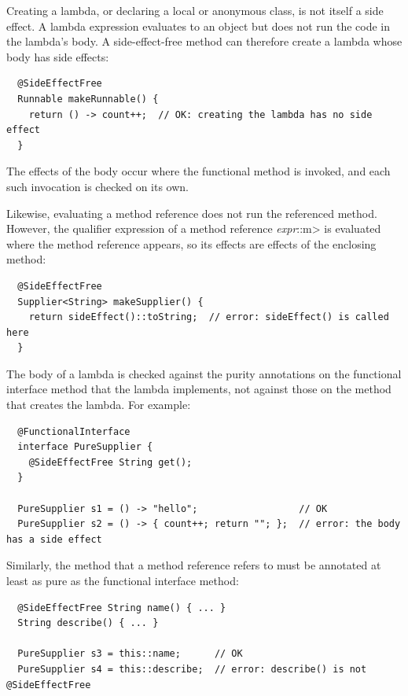 
Creating a lambda, or declaring a local or anonymous class, is not itself a
side effect.  A lambda expression evaluates to an object but does not run the code
in the lambda's body.  A side-effect-free method can therefore create a lambda
whose body has side effects:

\begin{Verbatim}
  @SideEffectFree
  Runnable makeRunnable() {
    return () -> count++;  // OK: creating the lambda has no side effect
  }
\end{Verbatim}

\noindent
The effects of the body occur where the functional method is invoked, and
each such invocation is checked on its own.

Likewise, evaluating a method reference does not run the referenced method.
However, the qualifier expression of a method reference \<\emph{expr}::m>
is evaluated where the method reference appears, so its effects are effects
of the enclosing method:

\begin{Verbatim}
  @SideEffectFree
  Supplier<String> makeSupplier() {
    return sideEffect()::toString;  // error: sideEffect() is called here
  }
\end{Verbatim}

The body of a lambda is checked against the purity annotations on the
functional interface method that the lambda implements, not against those on
the method that creates the lambda.  For example:

\begin{Verbatim}
  @FunctionalInterface
  interface PureSupplier {
    @SideEffectFree String get();
  }

  PureSupplier s1 = () -> "hello";                  // OK
  PureSupplier s2 = () -> { count++; return ""; };  // error: the body has a side effect
\end{Verbatim}

\noindent
Similarly, the method that a method reference refers to must be annotated
at least as pure as the functional interface method:

\begin{Verbatim}
  @SideEffectFree String name() { ... }
  String describe() { ... }

  PureSupplier s3 = this::name;      // OK
  PureSupplier s4 = this::describe;  // error: describe() is not @SideEffectFree
\end{Verbatim}

